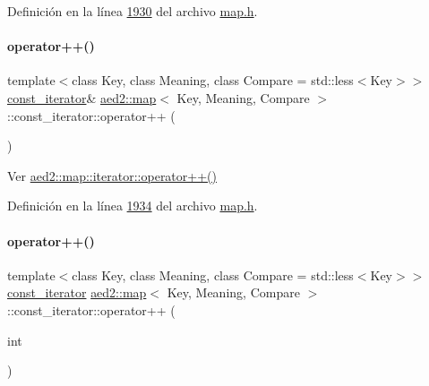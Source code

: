 Definición en la línea \hyperlink{map_8h_source_l01930}{1930} del archivo \hyperlink{map_8h_source}{map.\+h}.

\mbox{\label{classaed2_1_1map_1_1const__iterator_adaada1d489552555135d2ea89c67c271_adaada1d489552555135d2ea89c67c271}} 
\paragraph{\texorpdfstring{operator++()}{operator++()}\hspace{0.1cm}{\footnotesize\ttfamily [1/2]}}
{\footnotesize\ttfamily template$<$class Key, class Meaning, class Compare = std\+::less$<$\+Key$>$$>$ \\
\hyperlink{classaed2_1_1map_1_1const__iterator}{const\+\_\+iterator}\& \hyperlink{classaed2_1_1map}{aed2\+::map}$<$ Key, Meaning, Compare $>$\+::const\+\_\+iterator\+::operator++ (\begin{DoxyParamCaption}{ }\end{DoxyParamCaption})\hspace{0.3cm}{\ttfamily [inline]}}



Ver \hyperlink{classaed2_1_1map_1_1iterator_a7c44de7f0508186e135ddbcfe782fec5_a7c44de7f0508186e135ddbcfe782fec5}{aed2\+::map\+::iterator\+::operator++()} 



Definición en la línea \hyperlink{map_8h_source_l01934}{1934} del archivo \hyperlink{map_8h_source}{map.\+h}.

\mbox{\label{classaed2_1_1map_1_1const__iterator_a2fbc216b2f11694bb567ea850bcfdb2e_a2fbc216b2f11694bb567ea850bcfdb2e}} 
\paragraph{\texorpdfstring{operator++()}{operator++()}\hspace{0.1cm}{\footnotesize\ttfamily [2/2]}}
{\footnotesize\ttfamily template$<$class Key, class Meaning, class Compare = std\+::less$<$\+Key$>$$>$ \\
\hyperlink{classaed2_1_1map_1_1const__iterator}{const\+\_\+iterator} \hyperlink{classaed2_1_1map}{aed2\+::map}$<$ Key, Meaning, Compare $>$\+::const\+\_\+iterator\+::operator++ (\begin{DoxyParamCaption}\item[{int}]{ }\end{DoxyParamCaption})\hspace{0.3cm}{\ttfamily [inline]}}



